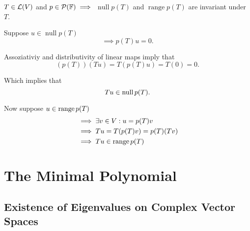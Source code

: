 \begin{thm} 
  \label{thm: null space and range of p(T) are invariant under T}
  $T \in \mathcal{L}(V)$ and $p\in \mathcal{P} (\mathbb{F}) \implies$
  $\operatorname{null} p(T)$ and $\operatorname{range} p(T)$ are invariant under $T$.
\end{thm}
\begin{prf}
  Suppose $u\in \operatorname{null} p(T)$
  \begin{equation}
    \implies p(T)u = 0. 
  \end{equation}
  
  Assoziativiy and distributivity of linear maps imply that 
  \begin{equation}
    (p(T))(Tu)=T(p(T)u)=T(0)=0.
  \end{equation}
  
  Which implies that
  \begin{equation}
    Tu \in \operatorname{null} p(T).
  \end{equation}

  Now suppose $u \in \operatorname{range} p(T)$
  \begin{equation}
    \begin{aligned}
    &\implies \exists v\in V: u=p(T)v \\
    &\implies Tu=T(p(T)v)=p(T)(Tv) \\
    &\implies Tu \in \operatorname{range} p(T)
    \end{aligned}
  \end{equation}
\end{prf}

\section{The Minimal Polynomial}
\subsection{Existence of Eigenvalues on Complex Vector Spaces}

